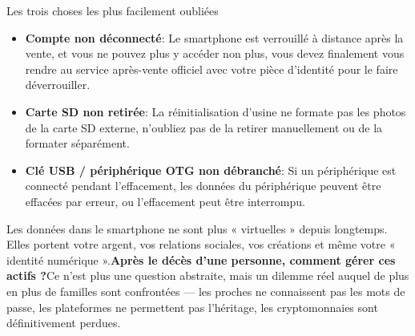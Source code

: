 \begin{tcbwarn}{Les trois choses les plus facilement oubliées}
\begin{itemize}
  \item \textbf{Compte non déconnecté}: Le smartphone est verrouillé à distance après la vente, et vous ne pouvez plus y accéder non plus, vous devez finalement vous rendre au service après-vente officiel avec votre pièce d'identité pour le faire déverrouiller.
  \item \textbf{Carte SD non retirée}: La réinitialisation d'usine ne formate pas les photos de la carte SD externe, n'oubliez pas de la retirer manuellement ou de la formater séparément.
  \item \textbf{Clé USB / périphérique OTG non débranché}: Si un périphérique est connecté pendant l'effacement, les données du périphérique peuvent être effacées par erreur, ou l'effacement peut être interrompu.
\end{itemize}

\end{tcbwarn}


Les données dans le smartphone ne sont plus « virtuelles » depuis longtemps. Elles portent votre argent, vos relations sociales, vos créations et même votre « identité numérique ».\textbf{Après le décès d'une personne, comment gérer ces actifs ?}Ce n'est plus une question abstraite, mais un dilemme réel auquel de plus en plus de familles sont confrontées — les proches ne connaissent pas les mots de passe, les plateformes ne permettent pas l'héritage, les cryptomonnaies sont définitivement perdues.

